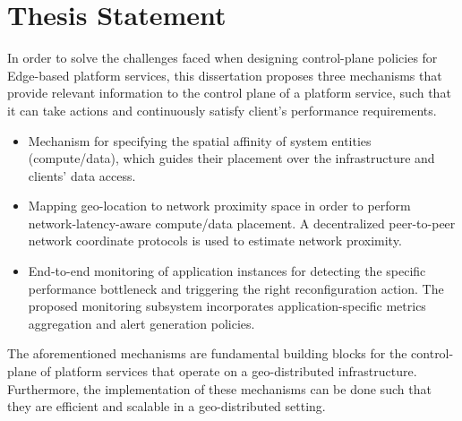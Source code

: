\section{Thesis Statement}
In order to solve the challenges faced when designing control-plane policies for Edge-based platform services, this dissertation proposes three mechanisms that provide relevant information to the control plane of a platform service, such that it can take actions and continuously satisfy client's performance requirements.
\begin{itemize}
\item Mechanism for specifying the spatial affinity of system entities (compute/data), which guides their placement over the infrastructure and clients' data access. 
\item Mapping geo-location to network proximity space in order to perform network-latency-aware compute/data placement. A decentralized peer-to-peer network coordinate protocols is used to estimate network proximity.
\item End-to-end monitoring of application instances for detecting the specific performance bottleneck and triggering the right reconfiguration action. The proposed monitoring subsystem incorporates application-specific metrics aggregation and alert generation policies. 
\end{itemize}

The aforementioned mechanisms are fundamental building blocks for the control-plane of platform services that operate on a geo-distributed infrastructure. Furthermore, the implementation of these mechanisms can be done such that they are efficient and scalable in a geo-distributed setting.

